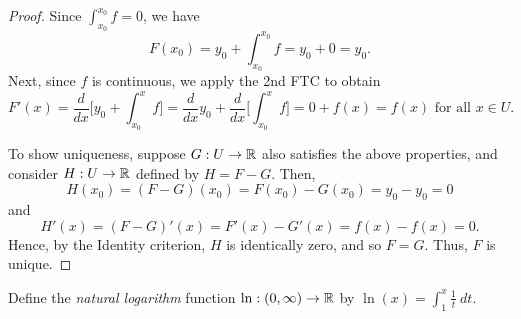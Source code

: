 \documentclass[letterpaper, twoside, 12pt]{book}
\begin{document}
\begin{proof}
    Since \(\int_{x_0}^{x_0} f = 0\), we have 
    \[ F(x_0) = y_0 + \int_{x_0}^{x_0} f = y_0 + 0 = y_0 .\]
    Next, since \(f\) is continuous, we apply the 2nd FTC to obtain
    \[ F'(x) = \frac{d}{dx}\bigg[y_0 + \int_{x_0}^x f \bigg] = 
    \frac{d}{dx} y_0 + \frac{d}{dx}\bigg[ \int_{x_0}^x f \bigg] = 0 + f(x) = f(x) \text{~for all~} x \in U .\]

    To show uniqueness, suppose \(G: U \to \mathbb R\) also satisfies the above
    properties, and consider \(H: U \to \mathbb R\) defined by \(H = F - G\).
    Then, \[H(x_0) = (F - G)(x_0) = F(x_0) - G(x_0) = y_0 - y_0 = 0 \]
    and 
    \[ H'(x) = (F - G)'(x) = F'(x) - G'(x) = f(x) - f(x) = 0 .\]
    Hence, by the Identity criterion, \(H\) is identically zero, and
    so \(F = G\). Thus, \(F\) is unique.
\end{proof}

\begin{definition}
  Define the \textit{natural logarithm} function
  \(\ln:(0,\infty)\to\mathbb R\) by \(\ln(x)=\int_1^x\frac{1}{t}~dt\).
\end{definition}
\end{document}
